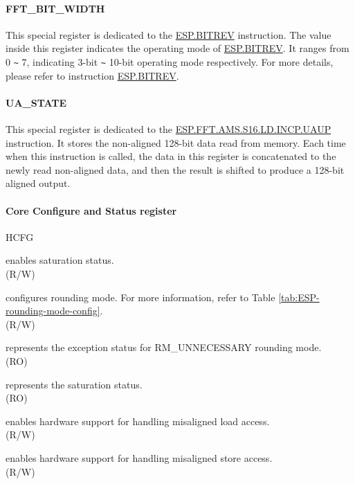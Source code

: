 \documentclass[main\_\_EN.tex]{subfiles}
\begin{document}
\paragraph{FFT\_BIT\_WIDTH}

This special register is dedicated to the \hyperref[instruction:ESPBITREV]{ESP.BITREV} instruction. The value inside this register indicates the operating mode of \hyperref[instruction:ESPBITREV]{ESP.BITREV}. It ranges from 0 \verb+~+ 7, indicating 3-bit \verb+~+ 10-bit operating mode respectively. For more details, please refer to instruction \hyperref[instruction:ESPBITREV]{ESP.BITREV}.

\paragraph{UA\_STATE}

This special register is dedicated to the \hyperref[instruction:ESPFFTAMSS16LDINCPUAUP]{ESP.FFT.AMS.S16.LD.INCP.UAUP} instruction. It stores the non-aligned 128-bit data read from memory. Each time when this instruction is called, the data in this register is concatenated to the newly read non-aligned data, and then the result is shifted to produce a 128-bit aligned output.

\paragraph{Core Configure and Status register}

\begin{register}{H}{CFG}{}\label{regdesc:ESPCFG}
%
%
%
%
%
%
%
\regnewline%
\begin{regdesc}\begin{reglist}
\label{vxsat_en}\item [vxsat\_en] enables saturation status.\\
(R/W)
\label{vxrm}\item [vxrm] configures rounding mode. For more information, refer to Table \ref{tab:ESP-rounding-mode-config}.\\
(R/W)
\label{rm_exc}\item [rm\_exc] represents the exception status for RM\_UNNECESSARY rounding mode.\\
(RO)
\label{vxsat}\item [vxsat] represents the saturation status.\\
(RO)
\label{mis_ld}\item [mis\_ld] enables hardware support for handling misaligned load access.\\
(R/W)
\label{mis_st}\item [mis\_st] enables hardware support for handling misaligned store access.\\ (R/W)
\end{reglist}\end{regdesc}
\end{register}
\end{document}

